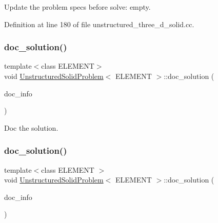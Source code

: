 Update the problem specs before solve\+: empty. 



Definition at line 180 of file unstructured\+\_\+three\+\_\+d\+\_\+solid.\+cc.

\mbox{\label{classUnstructuredSolidProblem_ab3d66fd61b69d12b4f159d763fc44f15}} 
\subsubsection{\texorpdfstring{doc\+\_\+solution()}{doc\_solution()}\hspace{0.1cm}{\footnotesize\ttfamily [1/2]}}
{\footnotesize\ttfamily template$<$class E\+L\+E\+M\+E\+NT$>$ \\
void \hyperlink{classUnstructuredSolidProblem}{Unstructured\+Solid\+Problem}$<$ E\+L\+E\+M\+E\+NT $>$\+::doc\+\_\+solution (\begin{DoxyParamCaption}\item[{Doc\+Info \&}]{doc\+\_\+info }\end{DoxyParamCaption})}



Doc the solution. 

\mbox{\label{classUnstructuredSolidProblem_ab3d66fd61b69d12b4f159d763fc44f15}} 
\subsubsection{\texorpdfstring{doc\+\_\+solution()}{doc\_solution()}\hspace{0.1cm}{\footnotesize\ttfamily [2/2]}}
{\footnotesize\ttfamily template$<$class E\+L\+E\+M\+E\+NT $>$ \\
void \hyperlink{classUnstructuredSolidProblem}{Unstructured\+Solid\+Problem}$<$ E\+L\+E\+M\+E\+NT $>$\+::doc\+\_\+solution (\begin{DoxyParamCaption}\item[{Doc\+Info \&}]{doc\+\_\+info }\end{DoxyParamCaption})}



